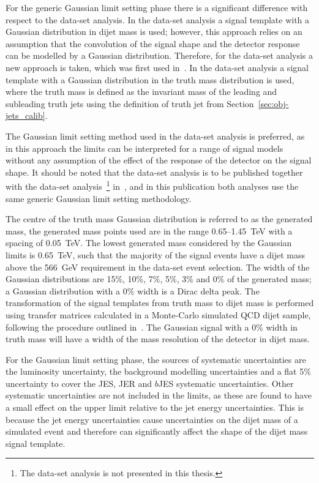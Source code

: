 \clearpage

For the generic Gaussian limit setting phase there is a significant difference with respect to the \summer{} data-set analysis.
In the \summer{} data-set analysis a signal template with a Gaussian distribution in dijet mass is used;
however, this approach relies on an assumption that the convolution of the signal shape and the detector response can be modelled by a Gaussian distribution.
Therefore, for the \lm{} data-set analysis a new approach is taken, which was first used in~\cite{dijet-mori17_paper}.
In the \lm{} data-set analysis a signal template with a Gaussian distribution in the truth mass distribution is used,
where the truth mass is defined as the invariant mass of the leading and subleading truth jets using the definition of truth jet from Section~\ref{sec:obj-jets_calib}.

The Gaussian limit setting method used in the \lm{} data-set analysis is preferred,
as in this approach the limits can be interpreted for a range of signal models without
any assumption of the effect of the response of the detector on the signal shape.
It should be noted that the \lm{} data-set analysis is to be published
together with the \hm{} data-set analysis~\footnote{ The \hm{} data-set analysis is not presented in this thesis.}
in~\cite{dibjet-full}, and in this publication both analyses use the same generic Gaussian limit setting methodology.

The centre of the truth mass Gaussian distribution is referred to as the generated mass,
the generated mass points used are in the range 0.65--1.45~TeV with a spacing of 0.05~TeV.
The lowest generated mass considered by the Gaussian limits is 0.65~TeV,
such that the majority of the signal events have a dijet mass above the 566~GeV requirement in the \lm{} data-set event selection.
The width of the Gaussian distributions are 15\%, 10\%, 7\%, 5\%, 3\% and 0\% of the generated mass;
a Gaussian distribution with a 0\% width is a Dirac delta peak.
The transformation of the signal templates from truth mass to dijet mass is performed using
transfer matrices calculated in a Monte-Carlo simulated QCD dijet sample,
following the procedure outlined in~\cite{dijet-mori17_paper}.
The Gaussian signal with a 0\% width in truth mass will have
a width of the mass resolution of the detector in dijet mass.

For the Gaussian limit setting phase, the sources of systematic uncertainties
are the luminosity uncertainty,
the background modelling uncertainties and a flat 5\% uncertainty to cover
the JES, JER and $b$JES systematic uncertainties.
Other systematic uncertainties are not included in the %
limits, as these are found to have a small effect on the upper limit relative to the jet energy uncertainties.
This is because the jet energy uncertainties cause uncertainties on the dijet mass of a simulated event and
therefore can significantly affect the shape of the dijet mass signal template.

